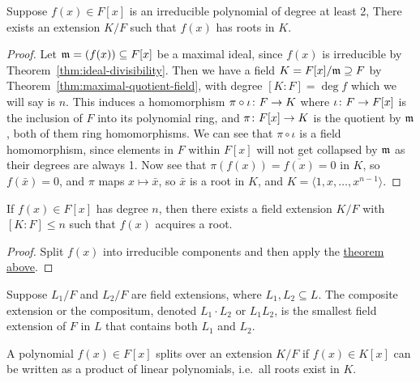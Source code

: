 \begin{theorem}\label{thm:field-extension-gain-root}
    Suppose \(f(x) \in F[x]\) is an irreducible polynomial of degree at least 2,
    There exists an extension \(K/F\) such that \(f(x)\) has roots in \(K\).
\end{theorem}
\begin{proof}
    Let \(\mathfrak{m} = (f(x)) \subseteq F[x]\) be a maximal ideal,
    since \(f(x)\) is irreducible by Theorem~\ref{thm:ideal-divisibility}.
    Then we have a field \(K = F[x]/\mathfrak{m} \supseteq F\)
    by Theorem~\ref{thm:maximal-quotient-field},
    with degree \([K:F] = \deg f\) which we will say is \(n\).
    This induces a homomorphism \(\pi\circ\iota\colon F\to K\)
    where \(\iota\colon F\to F[x]\) is the inclusion of \(F\) into its polynomial ring,
    and \(\pi\colon F[x]\to K\) is the quotient by \(\mathfrak{m}\),
    both of them ring homomorphisms.
    We can see that \(\pi\circ\iota\) is a field homomorphism,
    since elements in \(F\) within \(F[x]\) will not get collapsed by \(\mathfrak{m}\)
    as their degrees are always 1.
    Now see that \(\pi(f(x)) = \overline{f(x)} = 0\) in \(K\),
    so \(f(\bar{x}) = 0\), and \(\pi\) maps \(x \mapsto \bar{x}\),
    so \(\bar{x}\) is a root in \(K\),
    and \(K = \langle 1, x, \hdots, x^{n-1} \rangle\).
\end{proof}
\begin{corollary}
    If \(f(x) \in F[x]\) has degree \(n\),
    then there exists a field extension \(K/F\)
    with \([K:F] \leq n\) such that \(f(x)\) acquires a root.
\end{corollary}
\begin{proof}
    Split \(f(x)\) into irreducible components
    and then apply the \hyperref[thm:field-extension-gain-root]{theorem above}.
\end{proof}

\begin{definition}
    Suppose \(L_1/F\) and \(L_2/F\) are field extensions,
    where \(L_1,L_2 \subseteq L\).
    The composite extension or the compositum,
    denoted \(L_1 \cdot L_2\) or \(L_1 L_2\),
    is the smallest field extension of \(F\) in \(L\)
    that contains both \(L_1\) and \(L_2\).
\end{definition}

\begin{definition}
    A polynomial \(f(x) \in F[x]\) splits over an extension \(K/F\)
    if \(f(x) \in K[x]\) can be written as a product of linear polynomials,
    i.e.\ all roots exist in \(K\).
\end{definition}

